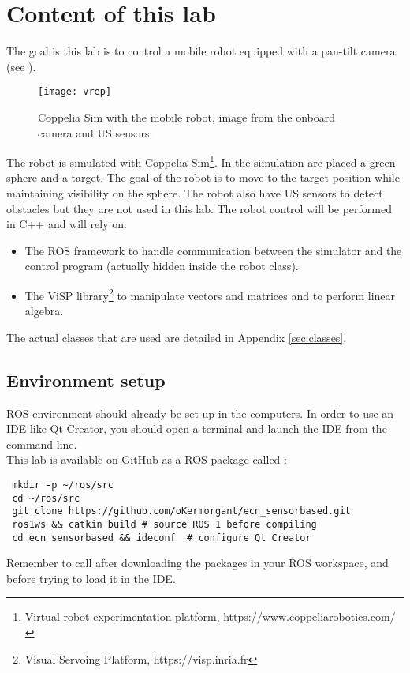 \documentclass{ecnreport}
\begin{document}




\section{Content of this lab}


The goal is this lab is to control a mobile robot equipped with a pan-tilt camera 
 (see ).

\begin{figure}[h!]\centering
 \texttt{[image: vrep]}
 \caption{Coppelia Sim with the mobile robot, image from the onboard camera and US sensors.}
 \label{fig:vrep}
\end{figure}

The robot is simulated with Coppelia Sim\footnote{Virtual robot experimentation platform, https://www.coppeliarobotics.com/}.
In the simulation are placed a green sphere and a target. The goal of the robot is to move to the target position while maintaining visibility on the sphere. The robot also have US sensors
to detect obstacles but they are not used in this lab.
The robot control will be performed in C++ and will rely on:

\begin{itemize}
 \item The ROS framework to handle communication between the simulator and the control program (actually hidden inside the robot class).
 \item The ViSP library\footnote{Visual Servoing Platform, https://visp.inria.fr} to manipulate vectors and matrices and to perform linear algebra.
\end{itemize}
The actual classes that are used are detailed in Appendix \ref{sec:classes}.\\

\subsection{Environment setup}

ROS environment should already be set up in the computers. 
In order to use an IDE like Qt Creator, you should open a terminal and launch the IDE from the command line.\\

This lab is available on GitHub as a ROS package called :
\begin{center}\bashstyle
\begin{lstlisting}
 mkdir -p ~/ros/src
 cd ~/ros/src
 git clone https://github.com/oKermorgant/ecn_sensorbased.git
 ros1ws && catkin build # source ROS 1 before compiling
 cd ecn_sensorbased && ideconf  # configure Qt Creator
\end{lstlisting}
\end{center}
Remember to call {} after downloading the packages in your ROS workspace, and before trying to load it in the IDE.
\end{document}
